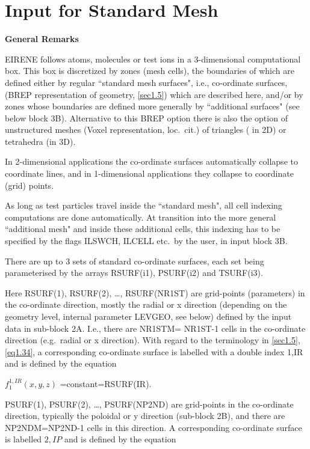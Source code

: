 \section{Input for Standard Mesh} \label{sec2.2}

\textbf{General Remarks} 

\medskip 

EIRENE follows atoms, molecules or test ions in a 3-dimensional computational
box.
This box is discretized by zones (mesh cells), the boundaries of which are
defined either by regular ``standard mesh surfaces", i.e., co-ordinate
surfaces, (\ac{BREP} representation of geometry, \cref{sec1.5}) which are
described here, and/or by zones whose boundaries are defined more generally by
``additional surfaces" (see below block 3B).
Alternative to this \ac{BREP} option there is also the option of unstructured
meshes (Voxel representation, loc.\ cit.) of triangles ( in 2D) or tetrahedra
(in 3D).

In 2-dimensional applications the co-ordinate surfaces automatically collapse
to coordinate lines, and in 1-dimensional applications they collapse to
coordinate (grid) points.

As long as test particles travel inside the ``standard mesh", all cell indexing
computations are done automatically.
At transition into the more general ``additional mesh" and inside these
additional cells, this indexing has to be specified by the flags ILSWCH, ILCELL
etc.\ by the user, in input block 3B.

There are up to 3 sets of standard co-ordinate surfaces, each set being
parameterised by the arrays RSURF(i1), PSURF(i2) and TSURF(i3).

Here RSURF(1), RSURF(2), \dots, RSURF(NR1ST) are grid-points (parameters) in
the  co-ordinate direction, mostly the radial or x direction
(depending on the geometry level, internal parameter LEVGEO, see below) defined
by the input data in sub-block 2A.
I.e., there are NR1STM= NR1ST-1 cells in the  co-ordinate
direction (e.g.\ radial or x direction).
With regard to the terminology in \cref{sec1.5}, \cref{eq1.34}, a corresponding
co-ordinate surface is labelled with a double index 1,IR and is defined by the
equation 

$f_1^{1,IR} (x,y,z)$ =constant=RSURF(IR).

PSURF(1), PSURF(2), \dots, PSURF(NP2ND) are grid-points in the 
co-ordinate direction, typically the poloidal or y direction (sub-block 2B),
and there are NP2NDM=NP2ND-1 cells in this direction.
A corresponding co-ordinate surface is labelled $2,IP$ and is defined by the
equation 

